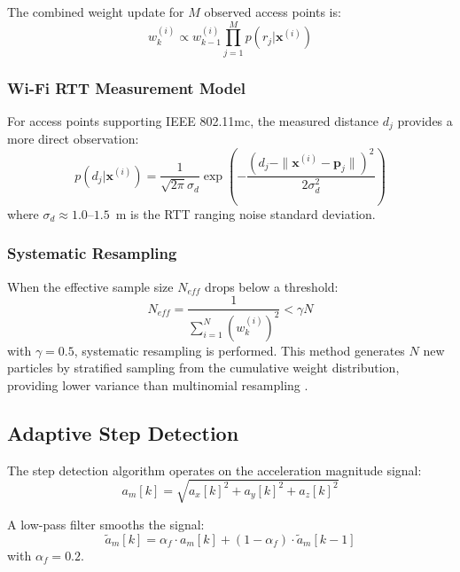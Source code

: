 \documentclass[journal,twocolumn]{IEEEtran}
\begin{document}
The combined weight update for $M$ observed access points is:
\begin{equation}
    w_k^{(i)} \propto w_{k-1}^{(i)} \prod_{j=1}^{M} p(r_j | \mathbf{x}^{(i)})
    \label{eq:weight_update}
\end{equation}

\subsubsection{Wi-Fi RTT Measurement Model}
For access points supporting IEEE 802.11mc, the measured distance $d_j$ provides a more direct observation:
\begin{equation}
    p(d_j | \mathbf{x}^{(i)}) = \frac{1}{\sqrt{2\pi}\sigma_d} \exp\left(-\frac{(d_j - \|\mathbf{x}^{(i)} - \mathbf{p}_j\|)^2}{2\sigma_d^2}\right)
    \label{eq:rtt_likelihood}
\end{equation}
where $\sigma_d \approx 1.0$--$1.5$~m is the RTT ranging noise standard deviation.

\subsubsection{Systematic Resampling}
When the effective sample size $N_{eff}$ drops below a threshold:
\begin{equation}
    N_{eff} = \frac{1}{\sum_{i=1}^N (w_k^{(i)})^2} < \gamma N
    \label{eq:neff}
\end{equation}
with $\gamma = 0.5$, systematic resampling is performed. This method generates $N$ new particles by stratified sampling from the cumulative weight distribution, providing lower variance than multinomial resampling \cite{gustafsson2010particle}.

\subsection{Adaptive Step Detection}

The step detection algorithm operates on the acceleration magnitude signal:
\begin{equation}
    a_m[k] = \sqrt{a_x[k]^2 + a_y[k]^2 + a_z[k]^2}
    \label{eq:accel_mag}
\end{equation}

A low-pass filter smooths the signal:
\begin{equation}
    \tilde{a}_m[k] = \alpha_f \cdot a_m[k] + (1 - \alpha_f) \cdot \tilde{a}_m[k-1]
    \label{eq:lowpass}
\end{equation}
with $\alpha_f = 0.2$.
\end{document}

